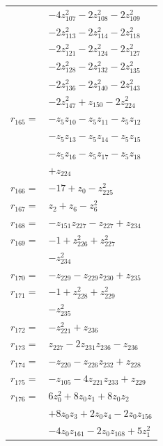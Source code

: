 \begin{longtable}{@{}r@{\;}l@{}}
 & \(\displaystyle -4z_{107}^{2} -2z_{108}^{2} -2z_{109}^{2}\) \\
 & \(\displaystyle -2z_{113}^{2} -2z_{114}^{2} -2z_{118}^{2}\) \\
 & \(\displaystyle -2z_{121}^{2} -2z_{124}^{2} -2z_{127}^{2}\) \\
 & \(\displaystyle -2z_{128}^{2} -2z_{132}^{2} -2z_{135}^{2}\) \\
 & \(\displaystyle -2z_{136}^{2} -2z_{140}^{2} -2z_{143}^{2}\) \\
 & \(\displaystyle -2z_{147}^{2} +z_{150} -2z_{224}^{2}\) \\[3pt]
\(r_{165}=\) & \(\displaystyle -z_{5}z_{10} -z_{5}z_{11} -z_{5}z_{12}\) \\
 & \(\displaystyle -z_{5}z_{13} -z_{5}z_{14} -z_{5}z_{15}\) \\
 & \(\displaystyle -z_{5}z_{16} -z_{5}z_{17} -z_{5}z_{18}\) \\
 & \(\displaystyle +z_{224}\) \\[3pt]
\(r_{166}=\) & \(\displaystyle -17 +z_{0} -z_{225}^{2}\) \\[3pt]
\(r_{167}=\) & \(\displaystyle z_{2} +z_{6} -z_{6}^{2}\) \\[3pt]
\(r_{168}=\) & \(\displaystyle -z_{151}z_{227} -z_{227} +z_{234}\) \\[3pt]
\(r_{169}=\) & \(\displaystyle -1 +z_{226}^{2} +z_{227}^{2}\) \\
 & \(\displaystyle -z_{234}^{2}\) \\[3pt]
\(r_{170}=\) & \(\displaystyle -z_{229} -z_{229}z_{230} +z_{235}\) \\[3pt]
\(r_{171}=\) & \(\displaystyle -1 +z_{228}^{2} +z_{229}^{2}\) \\
 & \(\displaystyle -z_{235}^{2}\) \\[3pt]
\(r_{172}=\) & \(\displaystyle -z_{221}^{2} +z_{236}\) \\[3pt]
\(r_{173}=\) & \(\displaystyle z_{227} -2z_{231}z_{236} -z_{236}\) \\[3pt]
\(r_{174}=\) & \(\displaystyle -z_{220} -z_{226}z_{232} +z_{228}\) \\[3pt]
\(r_{175}=\) & \(\displaystyle -z_{105} -4z_{221}z_{233} +z_{229}\) \\[3pt]
\(r_{176}=\) & \(\displaystyle 6z_{0}^{2} +8z_{0}z_{1} +8z_{0}z_{2}\) \\
 & \(\displaystyle +8z_{0}z_{3} +2z_{0}z_{4} -2z_{0}z_{156}\) \\
 & \(\displaystyle -4z_{0}z_{161} -2z_{0}z_{168} +5z_{1}^{2}\) \\

\end{longtable}
